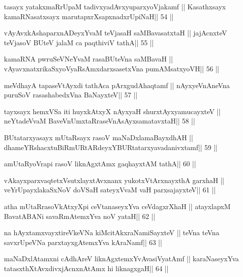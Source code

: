 \begin{shl}
tasayx yatakxmaRrUpaM tadivxyadAvxyuparxyoVjakamf ||
Kasathxsayx kamaRNasatxsayx marutapxrXsapxnadxrUpiNaH\hfill || 54 ||
\end{shl}

\begin{shl}
vAyAvxkAshaparxnADeyxYvaM teVjasaH saMBavasatxtaH ||
jajAcnxteV teVjasoV BUteV jalaM ca paqthiviV tathA\hfill || 55 ||
\end{shl}

\begin{shl}
kamaRNA pwruSeVNeYvaM rasaBUteVna saMBavaH ||
vAyavxnatxrikaSxyoVyaRsAmxdarxsasetxVna pumAMsatxyoVH\hfill || 56 ||
\end{shl}

\begin{shl}
meVdhayA tapaseVtAyxdi tathAca pArxgudAhaqtamf ||
nAyxyeVnAneVna puruSoV rasashabedxVna BaNayxteV\hfill || 57 ||
\end{shl}

\begin{shl}
tayxsayx hemxVSa iti huyxkAtxyX nAyxyaH shurxtAyx\s yamucayxteV ||
neYtadeVvaM BaveVnUmxtaRraseVnAsAyxsamatavxtaH\hfill || 58 ||
\end{shl}

\begin{shl}
BUtatarxyasayx mUtaRsayx rasoV maNaDxlamaBayxdhAH ||
dhameYRshacxtuBiRmURtARdeyxYBURtatarxyavadanivxtamf\hfill || 59 ||
\end{shl}

\begin{shl}
amUtaRyoVrapi rasoV liknAgxtAmx gaqhayxtAM tathA\hfill || 60 ||
\end{shl}

\begin{shl}
vAkayxparxvaqtetxVsutxlayxtAvxnanx yukotxV\s tArxnayxthA garxhaH ||
veYrUpayxlakaSxNoV doVSaH sateyxVvaM vaH parxsajayxteV\hfill || 61 ||
\end{shl}

\begin{shl}
atha mUtaRrasoVkAtxyX\s pi ceVtanaseyxYva ceVdagxrXhaH ||
atayxlapxM BavatA\s BANi savaRmAtemxYva noV yataH\hfill || 62 ||
\end{shl}

\begin{shl}
na hAyxtamxvayxtireVkeVNa kiMcitAkxraNamiSayxteV ||
teVna teVna savxrUpeVNa parxtayxgAtemxYva kAraNamf\hfill || 63 ||
\end{shl}

\begin{shl}
maNaDxlAtamxni cA\s\s dhAreV liknAgxtemxYvAvasiVyatAmf ||
karaNaseyxYva tatasxthXtAvxdivxjAcnxnAtAmx hi liknagxgaH\hfill || 64 ||
\end{shl}


